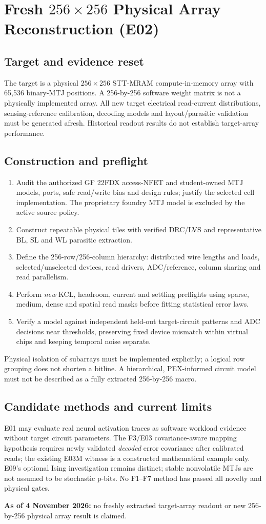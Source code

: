\section{Fresh \(256\times256\) Physical Array Reconstruction (E02)}
\subsection{Target and evidence reset}
The target is a physical \(256\times256\) STT-MRAM compute-in-memory array with 65,536 binary-MTJ positions. A 256-by-256 software weight matrix is not a physically implemented array. All new target electrical read-current distributions, sensing-reference calibration, decoding models and layout/parasitic validation must be generated afresh. Historical readout results do not establish target-array performance.

\subsection{Construction and preflight}
\begin{enumerate}
\item Audit the authorized GF 22FDX access-NFET and student-owned MTJ models, ports, safe read/write bias and design rules; justify the selected cell implementation. The proprietary foundry MTJ model is excluded by the active source policy.
\item Construct repeatable physical tiles with verified DRC/LVS and representative BL, SL and WL parasitic extraction.
\item Define the 256-row/256-column hierarchy: distributed wire lengths and loads, selected/unselected devices, read drivers, ADC/reference, column sharing and read parallelism.
\item Perform \emph{new} KCL, headroom, current and settling preflights using sparse, medium, dense and spatial read masks before fitting statistical error laws.
\item Verify a model against independent held-out target-circuit patterns and ADC decisions near thresholds, preserving fixed device mismatch within virtual chips and keeping temporal noise separate.
\end{enumerate}
Physical isolation of subarrays must be implemented explicitly; a logical row grouping does not shorten a bitline. A hierarchical, PEX-informed circuit model must not be described as a fully extracted 256-by-256 macro.

\subsection{Candidate methods and current limits}
E01 may evaluate real neural activation traces as software workload evidence without target circuit parameters. The F3/E03 covariance-aware mapping hypothesis requires newly validated \emph{decoded} error covariance after calibrated reads; the existing E03M witness is a constructed mathematical example only. E09's optional Ising investigation remains distinct; stable nonvolatile MTJs are not assumed to be stochastic p-bits. No F1--F7 method has passed all novelty and physical gates.

\textbf{As of 4 November 2026:} no freshly extracted target-array readout or new 256-by-256 physical array result is claimed.
